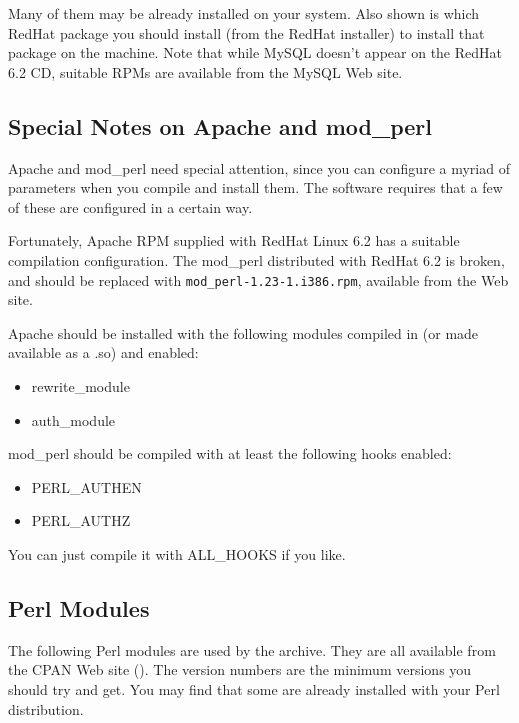 
Many of them may be already installed on your system. Also shown is which RedHat package you should install (from the RedHat installer) to install that package on the machine. Note that while MySQL doesn't appear on the RedHat 6.2 CD, suitable RPMs are available from the MySQL Web site.


\subsection{Special Notes on Apache and mod\_perl}

Apache and mod\_perl need special attention, since you can configure a myriad of parameters when you compile and install them. The software requires that a few of these are configured in a certain way.

Fortunately, Apache RPM supplied with RedHat Linux 6.2 has a suitable compilation configuration. The mod\_perl distributed with RedHat 6.2 is broken, and should be replaced with {\tt mod\_perl-1.23-1.i386.rpm}, available from the  Web site.

Apache should be installed with the following modules compiled in (or made available as a .so) and enabled:

\begin{itemize}
\item rewrite\_module
\item auth\_module
\end{itemize}

mod\_perl should be compiled with at least the following hooks enabled:

\begin{itemize}
\item PERL\_AUTHEN
\item PERL\_AUTHZ
\end{itemize}

You can just compile it with ALL\_HOOKS if you like.


\subsection{Perl Modules}

The following Perl modules are used by the \eprints archive. They are all available from the CPAN Web site (). The version numbers are the minimum versions you should try and get. You may find that some are already installed with your Perl distribution.

